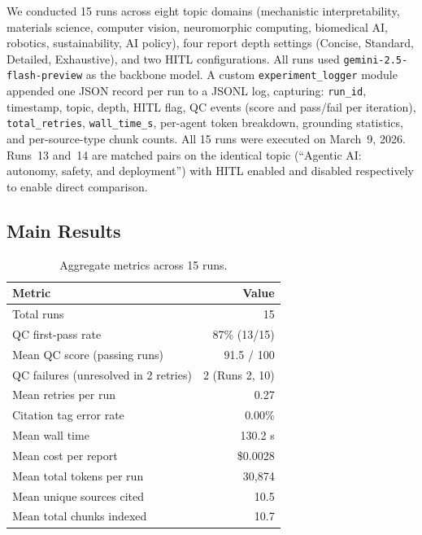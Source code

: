 \documentclass[11pt]{article}
\begin{document}
We conducted 15 runs across eight topic domains (mechanistic interpretability,
materials science, computer vision, neuromorphic computing, biomedical AI,
robotics, sustainability, AI policy), four report depth settings (Concise,
Standard, Detailed, Exhaustive), and two HITL configurations. All runs used
\texttt{gemini-2.5-flash-preview} as the backbone model. A custom
\texttt{experiment\_logger} module appended one JSON record per run to a JSONL
log, capturing: \texttt{run\_id}, timestamp, topic, depth, HITL flag, QC events
(score and pass/fail per iteration), \texttt{total\_retries}, \texttt{wall\_time\_s},
per-agent token breakdown, grounding statistics, and per-source-type chunk
counts. All 15 runs were executed on March~9, 2026. Runs~13 and~14 are matched
pairs on the identical topic (``Agentic AI: autonomy, safety, and deployment'')
with HITL enabled and disabled respectively to enable direct comparison.

\subsection{Main Results}

\begin{table}[h]
\centering
\caption{Aggregate metrics across 15 runs.}
\label{tab:aggregate}
\begin{tabular}{lr}
\toprule
\textbf{Metric} & \textbf{Value} \\
\midrule
Total runs & 15 \\
QC first-pass rate & 87\% (13/15) \\
Mean QC score (passing runs) & 91.5 / 100 \\
QC failures (unresolved in 2 retries) & 2 (Runs 2, 10) \\
Mean retries per run & 0.27 \\
Citation tag error rate & 0.00\% \\
Mean wall time & 130.2 s \\
Mean cost per report & \$0.0028 \\
Mean total tokens per run & 30,874 \\
Mean unique sources cited & 10.5 \\
Mean total chunks indexed & 10.7 \\
\bottomrule
\end{tabular}
\end{table}
\end{document}
